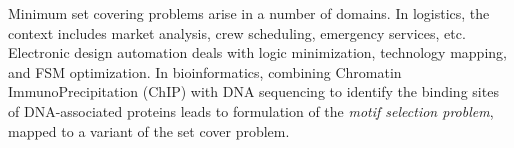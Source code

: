 

%



\noindent
Minimum set covering problems arise in a number of domains. In logistics, the context includes market analysis, crew scheduling, emergency services, etc. Electronic design automation %
deals with logic minimization, technology mapping, and FSM optimization. 
In bioinformatics, combining Chromatin ImmunoPrecipitation (ChIP) with DNA sequencing to identify the binding sites of DNA-associated proteins
leads to formulation of the {\it motif selection problem}, mapped to a variant of the set cover problem.

